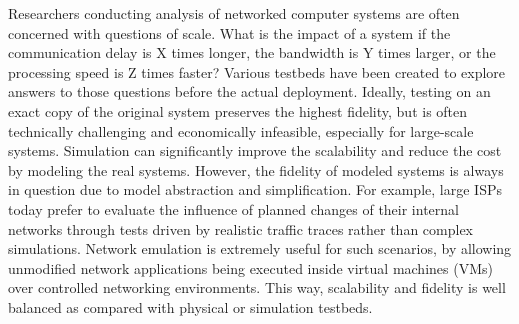 \label{VT:Sec:Motivation}

Researchers conducting analysis of networked computer systems are often concerned with questions of scale.
What is the impact of a system if the communication delay is X times longer, the bandwidth is Y times larger, or the processing speed is Z times faster? 
Various testbeds have been created to explore answers to those questions before the actual deployment.
Ideally, testing on an exact copy of the original system preserves the highest fidelity,
but is often technically challenging and economically infeasible, especially for large-scale systems. 
Simulation can significantly improve the scalability and reduce the cost by modeling the real systems.
However, the fidelity of modeled systems is always in question due to model abstraction and simplification. 
For example, large ISPs today prefer to evaluate the influence of planned changes of their internal networks
through tests driven by realistic traffic traces rather than complex simulations. 
Network emulation is extremely useful for such scenarios, by allowing unmodified network
applications being executed inside virtual machines (VMs) over controlled networking environments.
This way, scalability and fidelity is well balanced as compared with physical or simulation testbeds.


